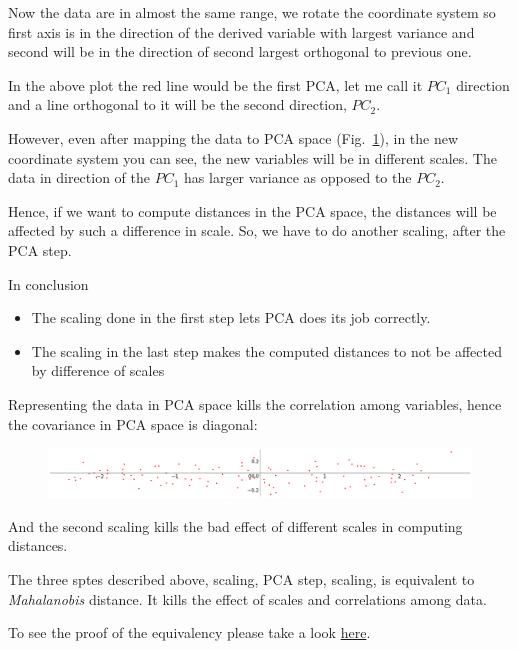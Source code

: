 \documentclass[12pt, letterpaper]{article}
\begin{document}
Now the data are in almost the same range, 
we rotate the coordinate system so first 
axis is in the direction of the derived variable 
with largest variance and second will be 
in the direction of second largest orthogonal to previous one.

In the above plot the red line would be 
the first PCA, let me call it $PC_1$ 
direction and a line orthogonal to it will be the second direction, $PC_2$. 

However, even after mapping
the data to PCA space (Fig.~\ref{fig:areaPrice3}), 
in the new coordinate system you can see, the new variables will be in different scales. The data in direction of the $PC_1$ has larger variance as opposed to the $PC_2$. 

Hence, if we want to compute distances 
in the PCA space, the distances will be 
affected by such a difference in scale. 
So, we have to do another scaling, after the PCA step.

In conclusion
\begin{itemize}
   \item The scaling done in the first step lets PCA does its job correctly.
   \item  The scaling in the last step makes the computed distances to not be affected by difference of scales
\end{itemize}
Representing the data
in PCA space kills the correlation among 
variables, hence the covariance in PCA space is diagonal:


\begin{figure}[h]
    \centering
    \includegraphics[width=1\textwidth]{3.png}
    \caption{}
    \label{fig:areaPrice3}
\end{figure}



And the second scaling kills the bad effect of different scales in computing distances. 

The three sptes described above, scaling, PCA step, scaling, is equivalent to \emph{Mahalanobis} distance.
It kills the effect of scales and correlations among data.

To see the proof of the equivalency please take a look
\href{https://static1.squarespace.com/static/5a4c161cfe54ef45b17aa18e/t/5cbc0736ecaa100001bf4240/1555826488060/mahab_equal.pdf}{here}.
\end{document}
